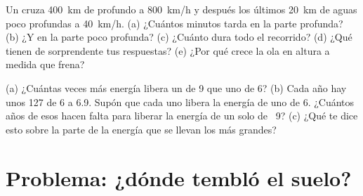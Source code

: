 \begin{exercise}[$\star\star\star$]\label{exo:g7:earthquakes:11}
Un  cruza \qty{400}{km} de  profundo a \qty{800}{km/h} y
después los últimos \qty{20}{km} de aguas poco profundas a
\qty{40}{km/h}. (a) ¿Cuántos minutos tarda en la parte profunda? (b) ¿Y en
la parte poco profunda? (c) ¿Cuánto dura todo el recorrido? (d) ¿Qué
tienen de sorprendente tus respuestas? (e) ¿Por qué crece la ola en altura
a medida que frena?
\end{exercise}

\begin{exercise}[$\star\star\star$]\label{exo:g7:earthquakes:12}
(a) ¿Cuántas veces más energía libera un  de  9 que uno de
 6? (b) Cada año hay unos 127  de  6 a 6.9.
Supón que cada uno libera la energía de uno de  6. ¿Cuántos años
de esos  hacen falta para liberar la energía de un solo
 de ~9? (c) ¿Qué te dice esto sobre la parte de la
energía que se llevan los  más grandes?
\end{exercise}

\section{Problema: ¿dónde tembló el suelo?}

